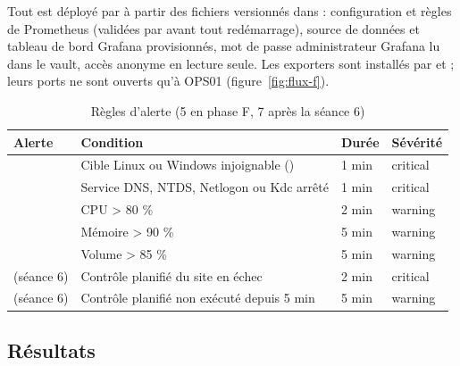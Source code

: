Tout est déployé par  à partir des fichiers versionnés dans
 : configuration et règles de Prometheus (validées par  avant tout
redémarrage), source de données et tableau de bord Grafana provisionnés, mot de passe
administrateur Grafana lu dans le vault, accès anonyme en lecture seule. Les exporters sont
installés par  et  ; leurs ports ne sont ouverts qu'à
OPS01 (figure~\ref{fig:flux-f}).


\begin{table}[H]
\centering
\caption{Règles d'alerte (5 en phase F, 7 après la séance 6)}\label{tab:regles}
\begin{tabularx}{\linewidth}{@{}P{4.3cm}LP{1.2cm}P{1.6cm}@{}}
\toprule
\textbf{Alerte} & \textbf{Condition} & \textbf{Durée} & \textbf{Sévérité} \\
\midrule
{} & Cible Linux ou Windows injoignable () & 1 min & critical \\
 & Service DNS, NTDS, Netlogon ou Kdc arrêté & 1 min & critical \\
 & CPU > 80 \% & 2 min & warning \\
 & Mémoire > 90 \% & 5 min & warning \\
 & Volume > 85 \% & 5 min & warning \\
 (séance 6) & Contrôle planifié du site en échec & 2 min & critical \\
 (séance 6) & Contrôle planifié non exécuté depuis 5 min & 5 min & warning \\
\bottomrule
\end{tabularx}
\end{table}

\subsection{Résultats}


